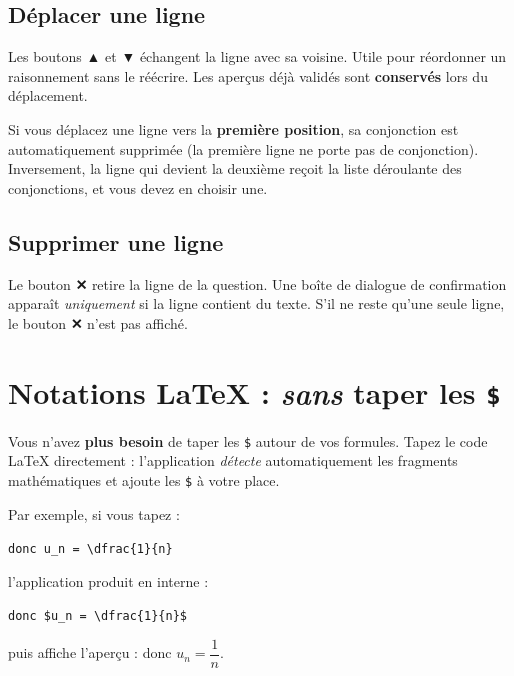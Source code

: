 \documentclass[11pt,a4paper]{article}
\begin{document}
\subsection{Déplacer une ligne}

Les boutons \textbf{▲} et \textbf{▼} échangent la ligne avec sa voisine. Utile
pour réordonner un raisonnement sans le réécrire. Les aperçus déjà validés
sont \textbf{conservés} lors du déplacement.

\begin{attention}
Si vous déplacez une ligne vers la \textbf{première position}, sa conjonction
est automatiquement supprimée (la première ligne ne porte pas de conjonction).
Inversement, la ligne qui devient la deuxième reçoit la liste déroulante des
conjonctions, et vous devez en choisir une.
\end{attention}

\subsection{Supprimer une ligne}

Le bouton \textbf{✕} retire la ligne de la question. Une boîte de dialogue de
confirmation apparaît \emph{uniquement} si la ligne contient du texte. S'il ne
reste qu'une seule ligne, le bouton \textbf{✕} n'est pas affiché.

\section{Notations \LaTeX{} : \emph{sans} taper les \texttt{\$}}
\label{sec:notations}

\begin{retenir}
Vous n'avez \textbf{plus besoin} de taper les \texttt{\$} autour de vos
formules. Tapez le code \LaTeX{} directement :
l'application \emph{détecte} automatiquement les fragments mathématiques et
ajoute les \texttt{\$} à votre place.

Par exemple, si vous tapez :

\begin{center}
\verb|donc u_n = \dfrac{1}{n}|
\end{center}

l'application produit en interne :

\begin{center}
\verb|donc $u_n = \dfrac{1}{n}$|
\end{center}

puis affiche l'aperçu : \quad donc $u_n = \dfrac{1}{n}$.
\end{retenir}
\end{document}
